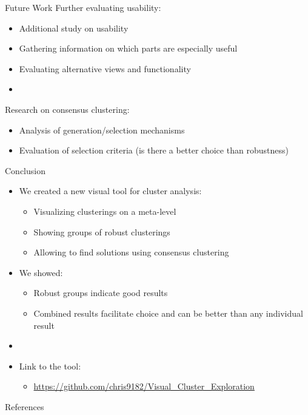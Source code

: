 \documentclass[aspectratio=169]{beamer}
\newcommand{\backupbegin}{
   \newcounter{finalframe}
   \setcounter{finalframe}{\value{framenumber}}
}
\newcommand{\backupend}{
   \setcounter{framenumber}{\value{finalframe}}
}
\begin{document}
\begin{frame}{Future Work}
Further evaluating usability:
	\begin{itemize}
	 	\item Additional study on usability
		\item Gathering information on which parts are especially useful
		\item Evaluating alternative views and functionality
		\item[]
	\end{itemize}

Research on consensus clustering:
	\begin{itemize}
	 	\item Analysis of generation/selection mechanisms
		\item Evaluation of selection criteria (is there a better choice than robustness)
	\end{itemize}

\end{frame}


\begin{frame}{Conclusion}

	\begin{itemize}
		\item We created a new visual tool for cluster analysis:
		\begin{itemize}
		 	\item Visualizing clusterings on a meta-level
			\item Showing groups of robust clusterings
			\item Allowing to find solutions using consensus clustering
		\end{itemize}
		\item We showed:
		\begin{itemize}
		 	\item Robust groups indicate good results
		 	\item Combined results facilitate choice and can be better than any individual result
		\end{itemize}
		\item[]
		\item Link to the tool:
		\begin{itemize}
			\item \url{https://github.com/chris9182/Visual_Cluster_Exploration}
		\end{itemize}
	\end{itemize}

\end{frame}

\appendix
\backupbegin

\begin{frame}[allowframebreaks]{References}
\printbibliography
\end{frame}
\backupend
\end{document}
